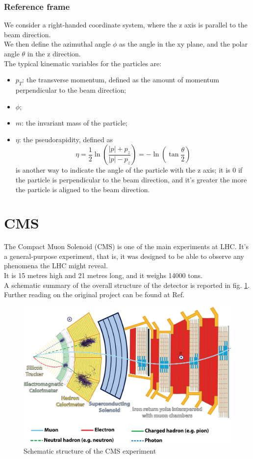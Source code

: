 \subsubsection{Reference frame}
We consider a right-handed coordinate system, where the z axis is parallel to the beam direction.\\
We then define the azimuthal angle $\phi$ as the angle in the xy plane, and the polar angle $\theta$ in the z direction.\\
The typical kinematic variables for the particles are:
\begin{itemize}
    \item $p_T$: the transverse momentum, defined as the amount of momentum perpendicular to the beam direction;
    \item $\phi$;
    \item $m$: the invariant mass of the particle;
    \item $\eta$: the pseudorapidity, defined as 
    \begin{equation*}
        \eta = \frac{1}{2}\ln(\frac{|p|+ p_z}{|p| - p_z}) = - \ln(\tan\frac{\theta}{2})
    \end{equation*}
    is another way to indicate the angle of the particle with the z axis; it is 0 if the particle is perpendicular to the beam direction, and it's greater the more the particle is aligned to the beam direction.
\end{itemize}
\section{CMS}
\label{sec:cms}
The Compact Muon Solenoid (CMS) is one of the main experiments at LHC. It's a general-purpose experiment, that is, it was designed to be able to observe any phenomena the LHC might reveal.\\
It is 15 metres high and 21 metres long, and it weighs 14000 tons.\\
A schematic summary of the overall structure of the detector is reported in fig. \ref{cms}.\\
Further reading on the original project can be found at Ref. \cite{cms_detector}
\begin{figure}
    \centering
    \includegraphics[width = \textwidth]{images/cms.png}
    \caption{Schematic structure of the CMS experiment}
    \label{cms}
\end{figure}

